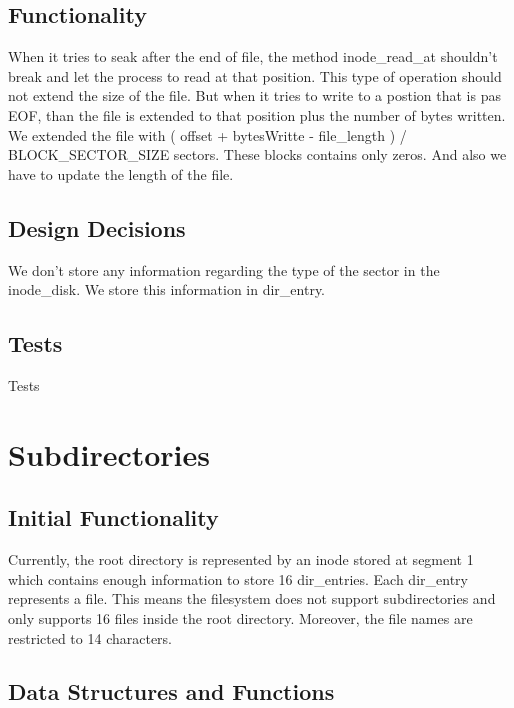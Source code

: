   

\subsection{Functionality}

When it tries to seak after the end of file, the method inode\_read\_at shouldn't break and let the process to read
at that position. This type of operation should not extend the size of the file. But when it tries to write to a postion
that is pas EOF, than the file is extended to that position plus the number of bytes written. We extended the file with
( offset + bytesWritte - file\_length ) / BLOCK\_SECTOR\_SIZE sectors. These blocks contains only zeros. And also we have to
update the length of the file.
  

\subsection{Design Decisions}

We don't store any information regarding the type of the sector in the inode\_disk. We store this information in dir\_entry.

\subsection{Tests}

Tests



\section{Subdirectories}

\subsection{Initial Functionality}

Currently, the root directory is represented by an inode stored at segment 1 which contains enough information to store 16 dir\_entries. Each dir\_entry represents a file. This means the filesystem does not support subdirectories and only supports 16 files inside the root directory. Moreover, the file names are restricted to 14 characters.
  
\subsection{Data Structures and Functions}
  
